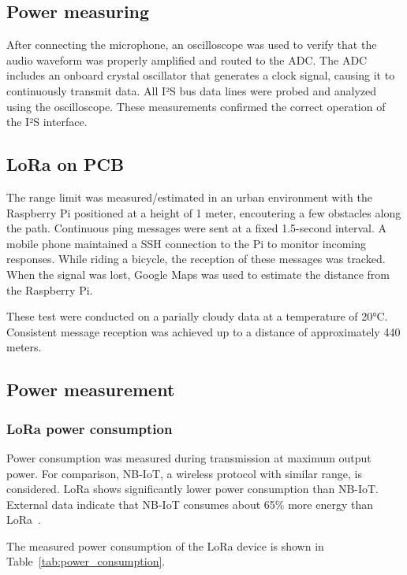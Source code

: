 \documentclass[conference]{IEEEtran}
\begin{document}
\subsection{Power measuring}

After connecting the microphone, an oscilloscope was used to verify that the audio waveform was properly amplified and routed to the ADC.
The ADC includes an onboard crystal oscillator that generates a clock signal, causing it to continuously transmit data.
All I²S bus data lines were probed and analyzed using the oscilloscope.
These measurements confirmed the correct operation of the I²S interface.

\subsection{LoRa on PCB}

The range limit was measured/estimated in an urban environment with the Raspberry Pi positioned at a height of 1 meter, encoutering a few obstacles along the path. Continuous ping messages were sent at a fixed 1.5-second interval. A mobile phone maintained a SSH connection to the Pi to monitor incoming responses. While riding a bicycle, the reception of these messages was tracked. When the signal was lost, Google Maps was used to estimate the distance from the Raspberry Pi. 

These test were conducted on a parially cloudy data at a temperature of 20°C. Consistent message reception was achieved up to a distance of approximately 440 meters.

\subsection{Power measurement}

\subsubsection{LoRa power consumption}

Power consumption was measured during transmission at maximum output power.  
For comparison, NB-IoT, a wireless protocol with similar range, is considered.  
LoRa shows significantly lower power consumption than NB-IoT.  
External data indicate that NB-IoT consumes about 65\% more energy than LoRa~\cite{Lora-nbiot_paper}.  

The measured power consumption of the LoRa device is shown in Table~\ref{tab:power_consumption}.
\end{document}
